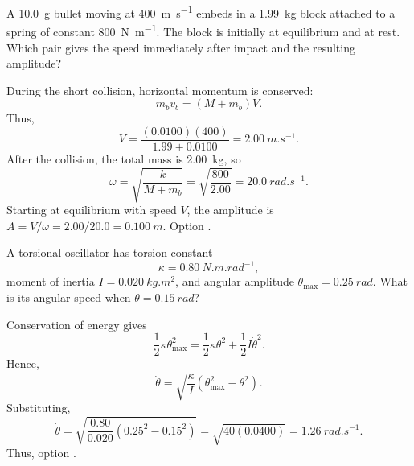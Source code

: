 \begin{quizquestion}[
  id=phy104-osc-024,
  topic=oscillations,
  difficulty=applied,
  marks=2,
  correct=A,
  tags={collision,ballistic-oscillator,amplitude},
  outcome={Combine momentum conservation with subsequent SHM}
]
  A \SI{10.0}{g} bullet moving at \SI{400}{m.s^{-1}} embeds in a \SI{1.99}{kg} block attached to a spring of constant \SI{800}{N.m^{-1}}. The block is initially at equilibrium and at rest. Which pair gives the speed immediately after impact and the resulting amplitude?
\end{quizquestion}
\begin{quizsolution}
  During the short collision, horizontal momentum is conserved:
    \[
      m_{b}v_{b}=(M+m_{b})V.
    \]
    Thus,
    \[
      V=\frac{(0.0100)(400)}{1.99+0.0100}=\SI{2.00}{m.s^{-1}}.
    \]
    After the collision, the total mass is \SI{2.00}{kg}, so
    \[
      \omega=\sqrt{\frac{k}{M+m_b}}=\sqrt{\frac{800}{2.00}}=\SI{20.0}{rad.s^{-1}}.
    \]
    Starting at equilibrium with speed \(V\), the amplitude is \(A=V/\omega=2.00/20.0=\SI{0.100}{m}\). Option \textbf{\quizcorrectletter}.
\end{quizsolution}

\begin{quizquestion}[
  id=phy104-osc-025,
  topic=oscillations,
  difficulty=applied,
  marks=2,
  correct=E,
  tags={torsional-oscillator,energy,angular-speed},
  outcome={Use energy conservation in a torsional oscillator}
]
  A torsional oscillator has torsion constant \[\kappa=\SI{0.80}{N.m.rad^{-1}},\] moment of inertia \(I=\SI{0.020}{kg.m^2}\), and angular amplitude \(\theta_{\max}=\SI{0.25}{rad}\). What is its angular speed when \(\theta=\SI{0.15}{rad}\)?
\end{quizquestion}
\begin{quizsolution}
  Conservation of energy gives
    \[
      \frac12\kappa\theta_{\max}^2
      =\frac12\kappa\theta^2+\frac12I\dot\theta^2.
    \]
    Hence,
    \[
      \dot\theta=\sqrt{\frac{\kappa}{I}\left(\theta_{\max}^2-\theta^2\right)}.
    \]
    Substituting,
    \[
      \dot\theta=\sqrt{\frac{0.80}{0.020}\left(0.25^2-0.15^2\right)}
      =\sqrt{40(0.0400)}
      =\SI{1.26}{rad.s^{-1}}.
    \]
    Thus, option \textbf{\quizcorrectletter}.
\end{quizsolution}

